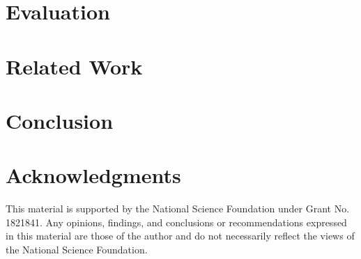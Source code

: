 \documentclass[a4paper,twoside]{article}
\begin{document}
\section{Evaluation}
\label{sec:eval}


\section{Related Work}
\label{sec:related}


\section{Conclusion}
\label{sec:concl}


\section{Acknowledgments}
This material is supported by the National Science Foundation under Grant No. 1821841. Any
opinions, findings, and conclusions or recommendations expressed in this material are those of the author and do not necessarily reflect the views of the National Science Foundation.


{\small
}
\end{document}
